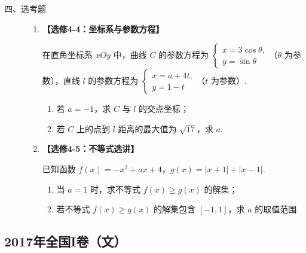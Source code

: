 \begin{description}

    \item[四、选考题]

    \begin{enumerate}[leftmargin=5pt]

      \addtocounter{enumi}{+21}

        \item \textbf{【选修4-4：坐标系与参数方程】}

在直角坐标系 \(xOy\) 中，曲线 \(C\) 的参数方程为
\(\begin{cases}
x=3\cos\theta,\\
y=\sin\theta
\end{cases}\)（\(\theta\) 为参数），直线 \(l\) 的参数方程为
\(\begin{cases}
x=a+4t,\\
y=1-t
\end{cases}\)（\(t\) 为参数）.

\begin{enumerate}
\item 若 \(a=-1\)，求 \(C\) 与 \(l\) 的交点坐标；
\item 若 \(C\) 上的点到 \(l\) 距离的最大值为 \(\sqrt{17}\)，求 \(a\).
\end{enumerate}

        \item \textbf{【选修4-5：不等式选讲】}

已知函数 \(f(x)=-x^2+ax+4\)，\(g(x)=\lvert x+1\rvert+\lvert x-1\rvert\).

\begin{enumerate}
\item 当 \(a=1\) 时，求不等式 \(f(x)\ge g(x)\) 的解集；
\item 若不等式 \(f(x)\ge g(x)\) 的解集包含 \([-1,1]\)，求 \(a\) 的取值范围.
\end{enumerate}

    \end{enumerate}

\end{description}


\subsection{2017年全国I卷（文）}\label{gk:2017年全国I卷（文）}

